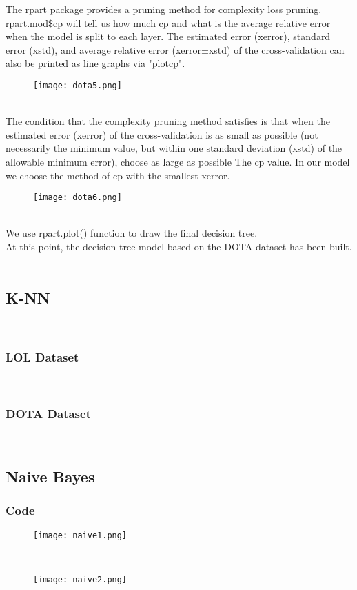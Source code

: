 \documentclass[a4paper,fleqn]{cas-sc}
\begin{document}
The rpart package provides a pruning method for complexity loss pruning. rpart.mod$\$ $cp will tell us how much cp and what is the average relative error when the model is split to each layer.  The estimated error (xerror), standard error (xstd), and average relative error (xerror±xstd) of the cross-validation can also be printed as line graphs via "plotcp".\\
\begin{figure}[h!]
	\centering
		\texttt{[image: dota5.png]}
	\caption{}
	\label{FIG:1}
\end{figure}\\
The condition that the complexity pruning method satisfies is that when the estimated error (xerror) of the cross-validation is as small as possible (not necessarily the minimum value, but within one standard deviation (xstd) of the allowable minimum error), choose as large as possible The cp value. In our model we  choose the method of cp with the smallest xerror.\\
\begin{figure}[h!]
	\centering
		\texttt{[image: dota6.png]}
	\caption{}
	\label{FIG:1}
\end{figure}\\
We use rpart.plot() function to draw the final decision tree.\\
At this point, the decision tree model based on the DOTA dataset has been built.\\\\
\subsection{K-NN}
 \\
\subsubsection{LOL Dataset}
 \\
\subsubsection{DOTA Dataset}
 \\
\subsection{Naive Bayes}
\subsubsection{Code} 
 \begin{figure}[h!]
	\centering
		\texttt{[image: naive1.png]}
	\caption{}
	\label{FIG:1}
\end{figure}\\
\begin{figure}[h!]
	\centering
		\texttt{[image: naive2.png]}
	\caption{}
	\label{FIG:1}
\end{figure}\\
 \\
\end{document}
